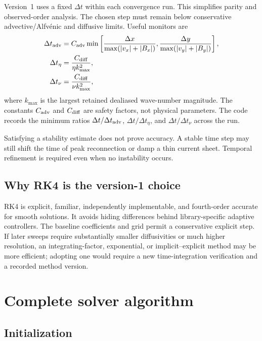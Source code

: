 \documentclass[11pt]{article}
\begin{document}
Version~1 uses a fixed $\Delta t$ within each convergence run. This simplifies parity and observed-order analysis. The chosen step must remain below conservative advective/Alfv\'enic and diffusive limits. Useful monitors are
\begin{align}
\Delta t_{\rm adv}
&=C_{\rm adv}
\min\left[
\frac{\Delta x}{\max(|v_x|+|B_x|)},
\frac{\Delta y}{\max(|v_y|+|B_y|)}
\right],
\label{eq:dtadv}\\
\Delta t_{\eta}
&=\frac{C_{\rm diff}}{\eta k_{\max}^2},\\
\Delta t_{\nu}
&=\frac{C_{\rm diff}}{\nu k_{\max}^2},
\label{eq:dtdiff}
\end{align}
where $k_{\max}$ is the largest retained dealiased wave-number magnitude. The constants $C_{\rm adv}$ and $C_{\rm diff}$ are safety factors, not physical parameters. The code records the minimum ratios $\Delta t/\Delta t_{\rm adv}$, $\Delta t/\Delta t_\eta$, and $\Delta t/\Delta t_\nu$ across the run.

\begin{warningbox}
Satisfying a stability estimate does not prove accuracy. A stable time step may still shift the time of peak reconnection or damp a thin current sheet. Temporal refinement is required even when no instability occurs.
\end{warningbox}

\subsection{Why RK4 is the version-1 choice}

RK4 is explicit, familiar, independently implementable, and fourth-order accurate for smooth solutions. It avoids hiding differences behind library-specific adaptive controllers. The baseline coefficients and grid permit a conservative explicit step. If later sweeps require substantially smaller diffusivities or much higher resolution, an integrating-factor, exponential, or implicit--explicit method may be more efficient; adopting one would require a new time-integration verification and a recorded method version.

\section{Complete solver algorithm}
\label{sec:algorithm}

\subsection{Initialization}
\end{document}
